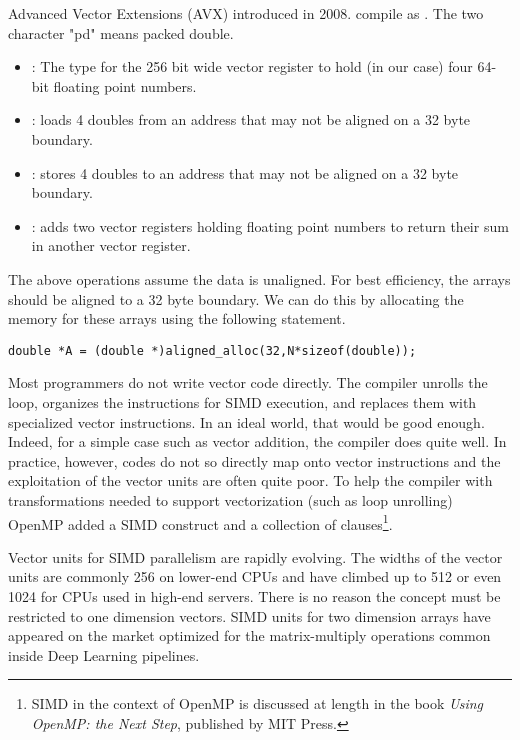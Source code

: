 Advanced Vector Extensions (AVX) introduced in 2008.   compile as .  The two character "pd" means packed double.
\begin{itemize}
\item {}: The type for the 256 bit wide vector register to hold (in our case) four 64-bit floating point numbers.
\item {}:  loads 4 doubles from an address that may not be aligned on a 32 byte boundary.
\item {}:  stores 4 doubles to an address that may not be aligned on a 32 byte boundary.
\item {}: adds  two vector registers holding floating point numbers to return 
their sum in another vector register.
\end{itemize}

The above operations assume the data is unaligned.  For best efficiency, the arrays  should be 
aligned to a 32 byte boundary.  We can do this by allocating the memory for these arrays using the following statement.
\begin{verbatim}
double *A = (double *)aligned_alloc(32,N*sizeof(double));
\end{verbatim}



Most programmers do not write vector code directly.  The compiler unrolls the loop, organizes the instructions for SIMD
execution, and replaces them with specialized vector instructions.  In an ideal world, that would be good enough. Indeed,
for a simple case such as vector addition, the compiler does quite well.  In practice, however, codes do not so directly map
onto vector instructions and the exploitation of the vector units are often quite poor.
To help the compiler with transformations needed to support vectorization (such as loop unrolling) OpenMP added
a SIMD construct and a collection of clauses\footnote{SIMD in the context of OpenMP is discussed at length in the book
\emph{Using OpenMP: the Next Step}, published by MIT Press.}.

Vector units for SIMD parallelism are rapidly evolving.  The widths of the vector units are commonly 256 on lower-end
CPUs and have climbed up to 512 or even 1024 for CPUs used in high-end servers.  There is no reason the concept must 
be restricted to one dimension vectors.   SIMD units for two dimension arrays have appeared on the market optimized
for the matrix-multiply operations common inside Deep Learning pipelines. 


